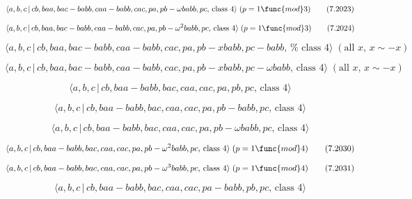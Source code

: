 \documentclass[10pt]{article}
\begin{document}
\begin{equation}
\langle a,b,c\,|\,cb,baa,bac-babb,caa-babb,cac,pa,pb-\omega babb,pc,\,\text{%
class }4\rangle \;(p=1\func{mod}3)  \tag{7.2023}
\end{equation}

\begin{equation}
\langle a,b,c\,|\,cb,baa,bac-babb,caa-babb,cac,pa,pb-\omega ^{2}babb,pc,\,%
\text{class }4\rangle \;(p=1\func{mod}3)  \tag{7.2024}
\end{equation}

\begin{equation}
\langle a,b,c\,|\,cb,baa,bac-babb,caa-babb,cac,pa,pb-xbabb,pc-babb,\,\text{%
class }4\rangle \;(\text{all }x,\,x\sim -x)  \tag{7.2025}
\end{equation}

\begin{equation}
\langle a,b,c\,|\,cb,baa,bac-babb,caa-babb,cac,pa,pb-xbabb,pc-\omega babb,\,%
\text{class }4\rangle \;(\text{all }x,\,x\sim -x)  \tag{7.2026}
\end{equation}

\begin{equation}
\langle a,b,c\,|\,cb,baa-babb,bac,caa,cac,pa,pb,pc,\,\text{class }4\rangle 
\tag{7.2027}
\end{equation}

\begin{equation}
\langle a,b,c\,|\,cb,baa-babb,bac,caa,cac,pa,pb-babb,pc,\,\text{class }%
4\rangle  \tag{7.2028}
\end{equation}

\begin{equation}
\langle a,b,c\,|\,cb,baa-babb,bac,caa,cac,pa,pb-\omega babb,pc,\,\text{class 
}4\rangle  \tag{7.2029}
\end{equation}

\begin{equation}
\langle a,b,c\,|\,cb,baa-babb,bac,caa,cac,pa,pb-\omega ^{2}babb,pc,\,\text{%
class }4\rangle \;(p=1\func{mod}4)  \tag{7.2030}
\end{equation}

\begin{equation}
\langle a,b,c\,|\,cb,baa-babb,bac,caa,cac,pa,pb-\omega ^{3}babb,pc,\,\text{%
class }4\rangle \;(p=1\func{mod}4)  \tag{7.2031}
\end{equation}

\begin{equation}
\langle a,b,c\,|\,cb,baa-babb,bac,caa,cac,pa-babb,pb,pc,\,\text{class }%
4\rangle  \tag{7.2032}
\end{equation}
\end{document}
